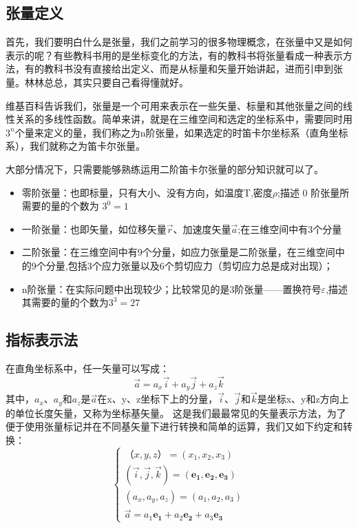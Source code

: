 \documentclass{ctexart}
\begin{document}
\subsection{张量定义}
    首先，我们要明白什么是张量，我们之前学习的很多物理概念，在张量中又是如何表示的呢？有些教科书用的是坐标变化的方法，有的教科书将张量看成一种表示方法，有的教科书没有直接给出定义、而是从标量和矢量开始讲起，进而引申到张量。林林总总，其实只要自己看得懂就好。\par
    维基百科告诉我们，张量是一个可用来表示在一些矢量、标量和其他张量之间的线性关系的多线性函数。简单来讲，就是在三维空间和选定的坐标系中，需要同时用$3^n$个量来定义的量，我们称之为n阶张量，如果选定的时笛卡尔坐标系（直角坐标系），我们就称之为笛卡尔张量。\par
    大部分情况下，只需要能够熟练运用二阶笛卡尔张量的部分知识就可以了。
\begin{提示}
    \begin{itemize}
    \item{零阶张量：也即标量，只有大小、没有方向，如温度T,密度$\rho$;描述 0 阶张量所需要的量的个数为 $3^0=1$}
    \item{一阶张量：也即矢量，如位移矢量$\vec{r}$、加速度矢量$\vec{a}$;在三维空间中有3个分量}
    \item{二阶张量：在三维空间中有9个分量，如应力张量是二阶张量，在三维空间中的9个分量,包括3个应力张量以及6个剪切应力（剪切应力总是成对出现）；}
    \item{n阶张量：在实际问题中出现较少；比较常见的是3阶张量——置换符号$\varepsilon $,描述其需要的量的个数为$3^3=27$}
    \end{itemize}
\end{提示}

\subsection{指标表示法}
\begin{提醒}
    在直角坐标系中，任一矢量可以写成：
    $$ \vec{a}={a}_{x}\vec{i}+{a}_{y}\vec{j}+{a}_{z}\vec{k} $$
    其中，${a}_{x}$、${a}_{y}$和${a}_{z}$是$\vec{a}$在x、y、z坐标下上的分量，$\vec{i}$、$\vec{j}$和$\vec{k}$是坐标x、y和z方向上的单位长度矢量，又称为坐标基矢量。
    这是我们最最常见的矢量表示方法，为了便于使用张量标记并在不同基矢量下进行转换和简单的运算，我们又如下约定和转换：
    $$
    \left\{\begin{array}{r}
    （x,y,z）=(x_1,x_2,x_3) \\
    (\vec{i}, \vec{j}, \vec{k})=\left(\boldsymbol{e_{1}}, \boldsymbol{e_{2}},\boldsymbol{e_{3}}\right) \\
    \left(a_{x}, a_{y}, a_{z}\right)=\left(a_{1}, a_{2}, a_{3}\right) \\
    \vec{a}=a_{1} \boldsymbol{e_{1}}+a_{2} \boldsymbol{e_{2}}+a_{3} \boldsymbol{e_{3}}
    \end{array}\right.
    $$
    
\end{提醒}
\end{document}
